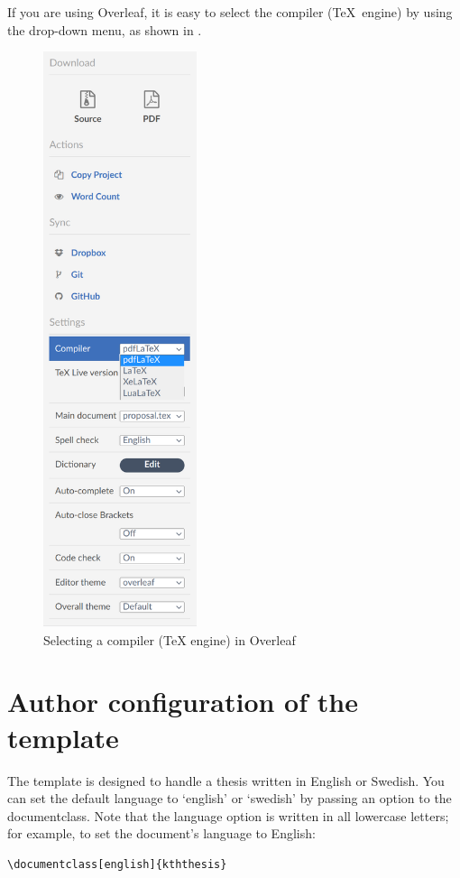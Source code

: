 \documentclass[examplethesis.tex]{subfiles}
\begin{document}
If you are using Overleaf, it is easy to select the compiler (\ie \TeX\ engine) by using the drop-down menu, as shown in .
\begin{figure}[!ht]
  \begin{center}
    \includegraphics[width=0.40\textwidth]{README_notes/selecting-engine-in-overleaf.png}
  \end{center}
  \caption{Selecting a compiler (\ie TeX engine) in Overleaf}
  \label{fig:selectingTeXEngine}
\end{figure}
\FloatBarrier


\section{Author configuration of the template}
\label{sec:authorConfigs}
The template is designed to handle a thesis written in English or Swedish.
You can set the default language to `english' or `swedish' by passing an option to the documentclass. Note that the language option is written in all lowercase letters; for example, to set the document's language to English:
\begin{lstlisting}[style=latexExampleForAuthors]
\documentclass[english]{kththesis}
\end{lstlisting}
\end{document}
